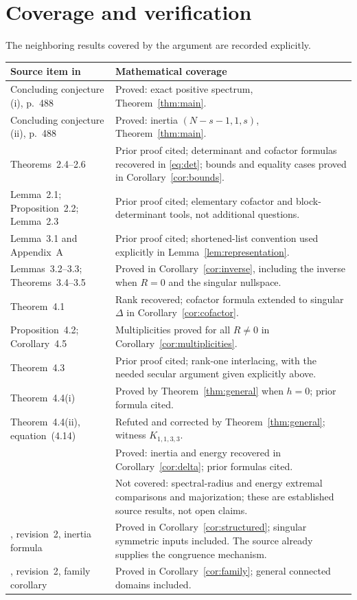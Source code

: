 \documentclass[11pt]{article}
\begin{document}
\section{Coverage and verification}
The neighboring results covered by the argument are recorded explicitly.
\begingroup\small
\begin{longtable}{>{\raggedright\arraybackslash}p{.36\linewidth}>{\raggedright\arraybackslash}p{.55\linewidth}}
\toprule
Source item in \cite{DM24} & Mathematical coverage\\
\midrule
\endhead
Concluding conjecture (i), p.~488 & Proved: exact positive spectrum, Theorem~\ref{thm:main}.\\
Concluding conjecture (ii), p.~488 & Proved: inertia $(N-s-1,1,s)$, Theorem~\ref{thm:main}.\\
Theorems~2.4--2.6 & Prior proof cited; determinant and cofactor formulas recovered in \eqref{eq:det}; bounds and equality cases proved in Corollary~\ref{cor:bounds}.\\
Lemma~2.1; Proposition~2.2; Lemma~2.3 & Prior proof cited; elementary cofactor and block-determinant tools, not additional questions.\\
Lemma~3.1 and Appendix~A & Prior proof cited; shortened-list convention used explicitly in Lemma~\ref{lem:representation}.\\
Lemmas~3.2--3.3; Theorems~3.4--3.5 & Proved in Corollary~\ref{cor:inverse}, including the inverse when $R=0$ and the singular nullspace.\\
Theorem~4.1 & Rank recovered; cofactor formula extended to singular $\Delta$ in Corollary~\ref{cor:cofactor}.\\
Proposition~4.2; Corollary~4.5 & Multiplicities proved for all $R\ne0$ in Corollary~\ref{cor:multiplicities}.\\
Theorem~4.3 & Prior proof cited; rank-one interlacing, with the needed secular argument given explicitly above.\\
Theorem~4.4(i) & Proved by Theorem~\ref{thm:general} when $h=0$; prior formula cited.\\
Theorem~4.4(ii), equation~(4.14) & Refuted and corrected by Theorem~\ref{thm:general}; witness $K_{1,1,3,3}$.\\
\cite[Theorems~4.1, 4.5]{DMspectral} & Proved: inertia and energy recovered in Corollary~\ref{cor:delta}; prior formulas cited.\\
\cite[Sections~5--6]{DMspectral} & Not covered: spectral-radius and energy extremal comparisons and majorization; these are established source results, not open claims.\\
\cite{Lucid}, revision~2, inertia formula & Proved in Corollary~\ref{cor:structured}; singular symmetric inputs included. The source already supplies the congruence mechanism.\\
\cite{Lucid}, revision~2, family corollary & Proved in Corollary~\ref{cor:family}; general connected domains included.\\
\bottomrule
\end{longtable}
\endgroup
\end{document}
